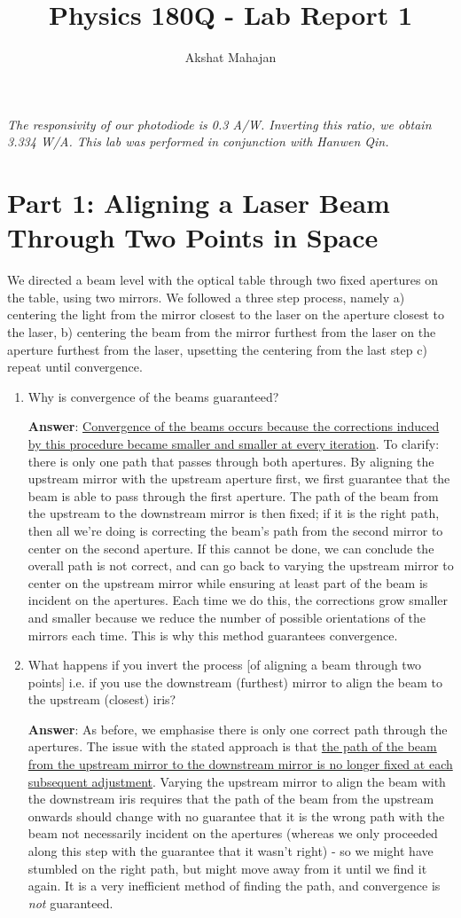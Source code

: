 \documentclass[10pt,a4paper]{article}
\author{Akshat Mahajan}
\title{Physics 180Q - Lab Report 1}
\begin{document}
\maketitle
\textsl{The responsivity of our photodiode is 0.3 A/W. Inverting this ratio, we obtain 3.334 W/A. This lab was performed in conjunction with Hanwen Qin.}
\section*{Part 1: Aligning a Laser Beam Through Two Points in Space}
We directed a beam level with the optical table through two fixed apertures on the table, using two mirrors. We followed a three step process, namely a) centering the light from the mirror closest to the laser on the aperture closest to the laser, b) centering the beam from the mirror furthest from the laser on the aperture furthest from the laser, upsetting the centering from the last step c) repeat until convergence.
\begin{enumerate}
\item Why is convergence of the beams guaranteed?

\textbf{Answer}: \ul{Convergence of the beams occurs because the corrections induced by this procedure became smaller and smaller at every iteration}. To clarify: there is only one path that passes through both apertures. By aligning the upstream mirror with the upstream aperture first, we first guarantee that the beam is able to pass through the first aperture. The path of the beam from the upstream to the downstream mirror is then fixed; if it is the right path, then all we're doing is correcting the beam's path from the second mirror to center on the second aperture. If this cannot be done, we can conclude the overall path is not correct, and can go back to varying the upstream mirror to center on the upstream mirror while ensuring at least part of the beam is incident on the apertures. Each time we do this, the corrections grow smaller and smaller because we reduce the number of possible orientations of the mirrors each time. This is why this method guarantees convergence.
\item What happens if you invert the process [of aligning a beam through two points] i.e. if you use the downstream (furthest) mirror to align the beam to the upstream (closest) iris?

\textbf{Answer}:  As before, we emphasise there is only one correct path through the apertures. The issue with the stated approach is that \ul{the path of the beam from the upstream mirror to the downstream mirror is no longer fixed at each subsequent adjustment}. Varying the upstream mirror to align the beam with the downstream iris requires that the path of the beam from the upstream onwards should change with no guarantee that it is the wrong path with the beam not necessarily incident on the apertures (whereas we only proceeded along this step with the guarantee that it wasn't right) - so we might have stumbled on the right path, but might move away from it until we find it again. It is a very inefficient method of finding the path, and convergence is \textit{not} guaranteed.  
\end{enumerate}
\end{document}
